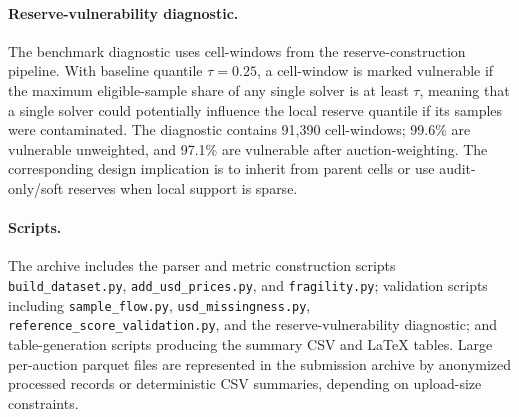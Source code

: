 \documentclass[11pt]{article}
\begin{document}
\paragraph{Reserve-vulnerability diagnostic.}
The benchmark diagnostic uses cell-windows from the reserve-construction
pipeline. With baseline quantile $\tau=0.25$, a cell-window is marked
vulnerable if the maximum eligible-sample share of any single solver is
at least $\tau$, meaning that a single solver could potentially influence
the local reserve quantile if its samples were contaminated. The
diagnostic contains 91,390 cell-windows; 99.6\% are vulnerable
unweighted, and 97.1\% are vulnerable after auction-weighting. The
corresponding design implication is to inherit from parent cells or use
audit-only/soft reserves when local support is sparse.

\paragraph{Scripts.}
The archive includes the parser and metric construction scripts
\texttt{build\_dataset.py}, \texttt{add\_usd\_prices.py}, and
\texttt{fragility.py}; validation scripts including
\texttt{sample\_flow.py}, \texttt{usd\_missingness.py},
\texttt{reference\_score\_validation.py}, and the reserve-vulnerability
diagnostic; and table-generation scripts producing the summary CSV and
\LaTeX{} tables. Large per-auction parquet files are represented in the
submission archive by anonymized processed records or deterministic CSV
summaries, depending on upload-size constraints.
\end{document}
